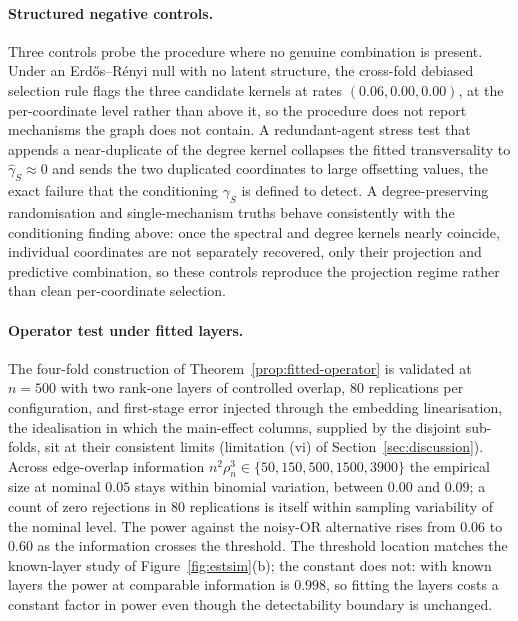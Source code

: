 \documentclass[12pt]{article}
\newcommand{\1}{\mathbf{1}}
\begin{document}
\paragraph{Structured negative controls.}
Three controls probe the procedure where no genuine combination is present. Under an
Erd\H{o}s--R\'enyi null with no latent structure, the cross-fold debiased selection rule flags the
three candidate kernels at rates $(0.06,0.00,0.00)$, at the per-coordinate level rather than above
it, so the procedure does not report mechanisms the graph does not contain. A redundant-agent stress
test that appends a near-duplicate of the degree kernel collapses the fitted transversality to
$\widehat\gamma_S\approx0$ and sends the two duplicated coordinates to large offsetting values, the
exact failure that the conditioning $\gamma_S$ is defined to detect. A degree-preserving
randomisation and single-mechanism truths behave consistently with the conditioning finding above:
once the spectral and degree kernels nearly coincide, individual coordinates are not separately
recovered, only their projection and predictive combination, so these controls reproduce the
projection regime rather than clean per-coordinate selection.

\paragraph{Operator test under fitted layers.}
The four-fold construction of Theorem~\ref{prop:fitted-operator} is validated at $n=500$ with
two rank-one layers of controlled overlap, $80$ replications per configuration, and first-stage error
injected through the embedding linearisation, the idealisation in which the main-effect columns,
supplied by the disjoint sub-folds, sit at their consistent limits (limitation (vi) of
Section~\ref{sec:discussion}). Across edge-overlap information
$n^2\rho_n^3\in\{50,150,500,1500,3900\}$ the empirical size at nominal $0.05$ stays within binomial
variation, between $0.00$ and $0.09$; a count of zero rejections in $80$ replications is itself
within sampling variability of the nominal level. The power against the noisy-OR alternative rises
from $0.06$ to $0.60$ as the information crosses the threshold. The threshold location matches the
known-layer study of Figure~\ref{fig:estsim}(b); the constant does not: with known layers the power at
comparable information is $0.998$, so fitting the layers costs a constant factor in power even
though the detectability boundary is unchanged.
\end{document}
